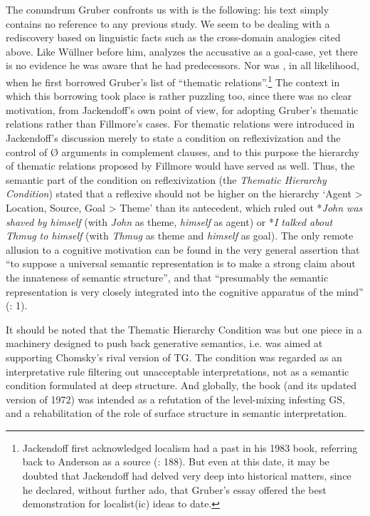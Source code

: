 \documentclass[output=paper]{langscibook}
\begin{document}
The conundrum Gruber confronts us with is the following: his text simply contains no reference to any previous study. We seem to be dealing with a rediscovery based on linguistic facts such as the cross-domain analogies cited above. Like Wüllner before him, \citet{gruber_look_1967} analyzes the accusative as a goal-case, yet there is no evidence he was aware that he had predecessors. Nor was \citet{jackendoff_rules_1969}, in all likelihood, when he first borrowed Gruber’s list of “thematic relations”.\footnote{\textrm{ Jackendoff first acknowledged localism had a past in his 1983 book, referring back to Anderson as a source (\citealt{jackendoff_semantics_1983}: 188). But even at this date, it may be doubted that Jackendoff had delved very deep into historical matters, since he declared, without further ado, that Gruber’s essay offered the best demonstration for localist(ic) ideas to date. }} The context in which this borrowing took place is rather puzzling too, since there was no clear motivation, from Jackendoff’s own point of view, for adopting Gruber’s thematic relations rather than Fillmore’s cases. For thematic relations were introduced in Jackendoff’s discussion merely to state a condition on reflexivization and the control of Ø arguments in complement clauses, and to this purpose the hierarchy of thematic relations proposed by Fillmore would have served as well. Thus, the semantic part of the condition on reflexivization (the \textit{Thematic Hierarchy Condition}) stated that a reflexive should not be higher on the hierarchy ‘Agent {\textgreater} Location, Source, Goal {\textgreater} Theme’ than its antecedent, which ruled out *\textit{John was shaved by himself} (with \textit{John} as theme, \textit{himself} as agent) or *\textit{I talked about Thmug to himself }(with \textit{Thmug} as theme and \textit{himself} as goal). The only remote allusion to a cognitive motivation can be found in the very general assertion that “to suppose a universal semantic representation is to make a strong claim about the innateness of semantic structure”, and that “presumably the semantic representation is very closely integrated into the cognitive apparatus of the mind” (\citeyear{jackendoff_rules_1969}: 1).

It should be noted that the Thematic Hierarchy Condition was but one piece in a machinery designed to push back generative semantics, i.e. was aimed at supporting Chomsky’s rival version of TG. The condition was regarded as an interpretative rule filtering out unacceptable interpretations, not as a semantic condition formulated at deep structure. And globally, the book (and its updated version of 1972) was intended as a refutation of the level-mixing infesting GS, and a rehabilitation of the role of surface structure in semantic interpretation.
\end{document}
